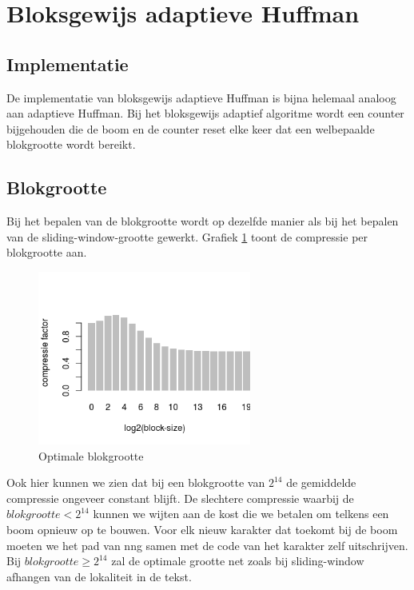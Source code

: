 \documentclass[twoside,twocolumn]{article}
\begin{document}
\section{Bloksgewijs adaptieve Huffman}

    \subsection{Implementatie}
    De implementatie van bloksgewijs adaptieve Huffman is bijna helemaal analoog aan adaptieve Huffman. Bij het bloksgewijs adaptief algoritme wordt een counter bijgehouden die de boom en de counter reset elke keer dat een welbepaalde blokgrootte wordt bereikt.
    \subsection{Blokgrootte}
    Bij het bepalen van de blokgrootte wordt op dezelfde manier als bij het bepalen van de sliding-window-grootte gewerkt.
    Grafiek \ref{blokgrootte} toont de compressie per blokgrootte aan.
        \begin{figure}[H]
            \begin{center}                
            \includegraphics[width=7cm]{images/blokgrootte.png}    
            \end{center}
            \caption{Optimale blokgrootte}
            \label{blokgrootte}

        \end{figure}
    Ook hier kunnen we zien dat bij een blokgrootte van $2^{14}$ de gemiddelde compressie ongeveer constant blijft.
    De slechtere compressie waarbij de $blokgrootte < 2^{14}$ kunnen we wijten aan de kost die we betalen om telkens een boom opnieuw op te bouwen.
    Voor elk nieuw karakter dat toekomt bij de boom moeten we het pad van nng samen met de code van het karakter zelf uitschrijven.
    Bij $blokgrootte \geq 2^{14}$ zal de optimale grootte net zoals bij sliding-window afhangen van de lokaliteit in de tekst. 
\end{document}
